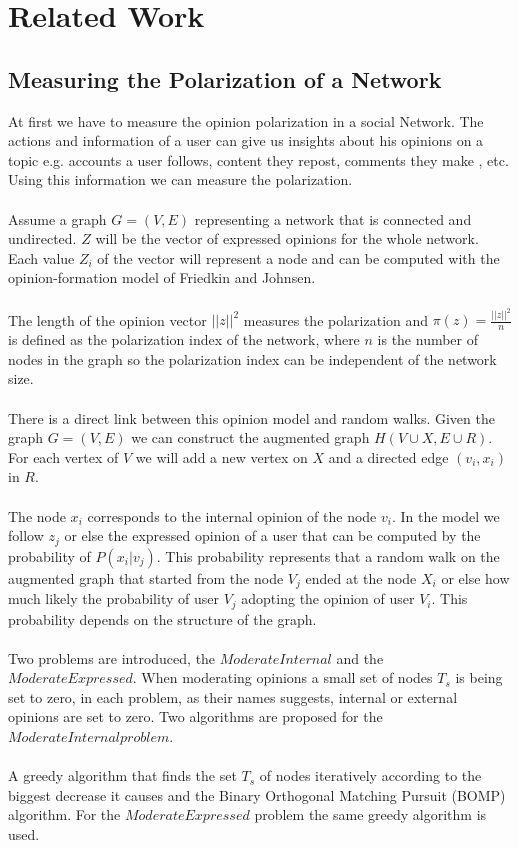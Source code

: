 \chapter{Related Work}
\label{ch:Instructions}


\section{Measuring the Polarization of a Network}
\label{sec:Submission}

At first we have to measure the opinion polarization in a social Network. The actions and information of a user can give us insights about his opinions on a topic e.g. accounts a user follows, content they repost, comments they make , etc. Using this information we can measure the polarization. 
\\
\\
Assume a graph $G = (V,E)$ representing a network that is connected and undirected. $Z$ will be the vector of expressed opinions for the whole network. Each value $Z_i$ of the vector will represent a node and can be computed with the opinion-formation model of Friedkin and Johnsen. 
\\
\\
The length of the opinion vector $||z|| ^2$ measures  the polarization and  $\pi(z) = \frac{||z|| ^2}n$ is defined as the polarization index of the network, where  $n$ is the number of nodes in the graph so the polarization index can be independent of the network size. 
\\
\\
There is a direct link between this opinion model and random walks. Given the graph $G = (V,E)$ we can construct the augmented graph $H(V∪X, E∪R)$. For each vertex of  $V$ we will add a new vertex on $X$ and a directed edge $(v_i,x_i)$ in $R$. 
\\
\\
The node $x_i$ corresponds to the internal opinion of the node $v_i$. In the model we follow $z_j$ or else the expressed opinion of a user that can be computed by the probability of $P(x_i |v_j)$. This probability represents that a random walk on the augmented graph that started from the node $V_j$ ended at the node $X_i$ or else how much likely the probability of user $V_j$ adopting the opinion of user $V_i$. This probability depends on the structure of the graph. 
\\
\\
Two problems are introduced, the $ModerateInternal$ and the $ModerateExpressed$. When moderating opinions a small set of nodes $T_s$ is being set to zero, in each problem, as their names suggests, internal or external opinions are set to zero. Two algorithms are proposed for the $ModerateInternal problem$. 
\\
\\
A greedy algorithm that finds the set $T_s$ of nodes iteratively according to the biggest decrease it causes and the Binary Orthogonal Matching Pursuit (BOMP) algorithm. For the $ModerateExpressed$ problem the same greedy algorithm is used.
\cite{tsapMatakosTerzi}


